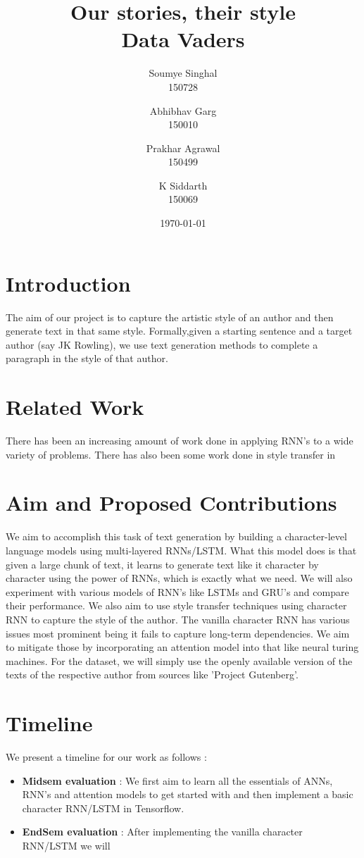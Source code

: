 \documentclass[9pt]{article}
\title{\textbf{Our stories, their style \\ Data Vaders}}
\author{Soumye Singhal \\ 150728 \and Abhibhav Garg \\ 150010 \and Prakhar Agrawal \\150499 \and K Siddarth
\\150069}
\date{\today}
\begin{document}
\maketitle

\section*{Introduction}
The aim of our project is to capture the artistic style of an author and then generate text in that same style. Formally,given a starting sentence and a target author (say JK Rowling), we use text generation methods to complete a paragraph in the style of that author. 
 
\section*{Related Work}
There has been an increasing amount of work done in applying RNN's to a wide variety of problems. There has also been some work done in style transfer in \cite*{2015arXiv150806576G} %



\section*{Aim and Proposed Contributions}
We aim to accomplish this task of text generation by building a character-level language models using multi-layered RNNs/LSTM. What this model does is that given a large chunk of text, it learns to generate text like it character by character using the power of RNNs, which is exactly what we need. We will also experiment with various models of RNN's like LSTMs and GRU's and compare their performance. We also aim to use style transfer techniques using character RNN to capture the style of the author. The vanilla character RNN has various issues most prominent being it fails to capture long-term dependencies. We aim to mitigate those by incorporating an attention model into that like neural turing machines.
For the dataset, we will simply use the openly available version of the texts of the respective author from sources like 'Project Gutenberg'. 
\par



\section*{Timeline}
We present a timeline for our work as follows :


\begin{itemize}
    \item \textbf{Midsem evaluation} : We first aim to learn all the essentials of ANNs, RNN's and attention models to get started with and then implement a basic character RNN/LSTM in Tensorflow.  
    \item \textbf{EndSem evaluation} : After implementing the vanilla character RNN/LSTM we will  
\end{itemize}
\printbibliography
\end{document}
